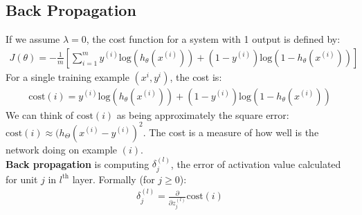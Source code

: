 \documentclass[a4paper,12pt]{report}
\begin{document}
\subsection{Back Propagation}
If we assume $\lambda = 0$, the cost function for a system with 1 output is defined by:
\begin{align*}
J(\theta) = -\frac{1}{m} \left[\sum_{i=1}^m y^{(i)} \mathrm{log}(h_{\theta}(x^{(i)})) + (1- y^{(i)}) \mathrm{log}(1-h_{\theta}(x^{(i)}))\right]
\end{align*}
For a single training example $(x^{i}, y^{i})$, the cost is:
\begin{align*}
\mathrm{cost}(i) = y^{(i)} \mathrm{log}(h_{\theta}(x^{(i)})) + (1- y^{(i)}) \mathrm{log}(1-h_{\theta}(x^{(i)}))
\end{align*}
We can think of $\mathrm{cost}(i)$ as being approximately the square error: $\mathrm{cost}(i) \approx (h_{\Theta}(x^{(i)} - y^{(i)})^2$. The cost is a measure of how well is the network doing on example $(i)$. \\
\textbf{Back propagation} is computing $\delta_j ^{(l)}$, the error of activation value calculated for unit $j$ in $l^{\mathrm{th}}$ layer. Formally (for $j \geq 0$):
\begin{align*}
\delta_j ^{(l)} = \frac{\partial }{\partial z_{j}^{(l)}} \mathrm{cost}(i)
\end{align*}
\end{document}
